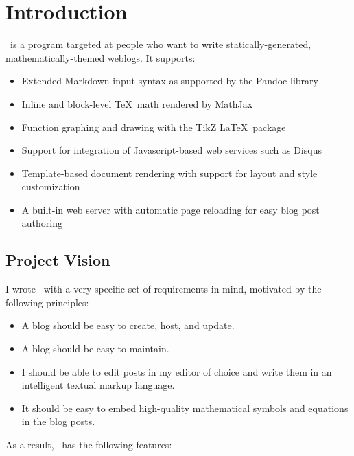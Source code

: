 \documentclass[11pt, letterpaper, oneside, titlepage]{book}
\begin{document}




\chapter{Introduction}

\mathblog\ is a program targeted at people who want to write
statically-generated, mathematically-themed weblogs.  It supports:

\begin{itemize}
\item{Extended Markdown input syntax as supported by the Pandoc
  library}
\item{Inline and block-level \TeX\ math rendered by MathJax}
\item{Function graphing and drawing with the TikZ \LaTeX\ package}
\item{Support for integration of Javascript-based web services such as
  Disqus}
\item{Template-based document rendering with support for layout and
  style customization}
\item{A built-in web server with automatic page reloading for easy
  blog post authoring}
\end{itemize}

\section{Project Vision}

I wrote \mathblog\ with a very specific set of requirements in mind,
motivated by the following principles:

\begin{itemize}
\item{A blog should be easy to create, host, and update.}
\item{A blog should be easy to maintain.}
\item{I should be able to edit posts in my editor of choice and write
  them in an intelligent textual markup language.}
\item{It should be easy to embed high-quality mathematical symbols and
  equations in the blog posts.}
\end{itemize}

As a result, \mathblog\ has the following features:
\end{document}
